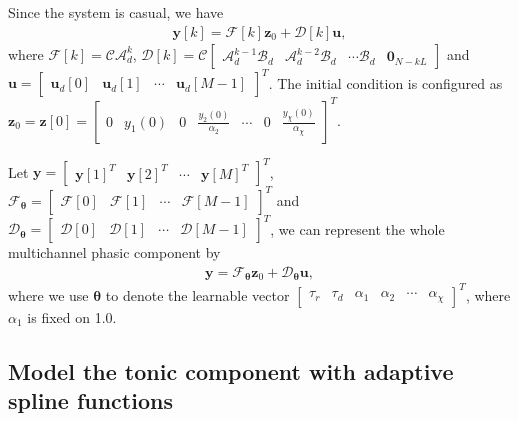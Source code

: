 \documentclass[10pt,conference]{ieeeconf}
\begin{document}
Since the system is casual, we have
\begin{align} \label{fml:the:out-dis}
\mathbf{y}[k] = \mathcal{F}[k] \mathbf{z}_0 + \mathcal{D}[k] \mathbf{u},
\end{align}
where $\mathcal{F}[k] = \mathcal{C}\mathcal{A}_d^k$, $\mathcal{D}[k] = \mathcal{C} \begin{bmatrix}
\mathcal{A}_d^{k-1} \mathcal{B}_d & \mathcal{A}_d^{k-2} \mathcal{B}_d & \cdots \mathcal{B}_d & \mathbf{0}_{N-kL}
\end{bmatrix}$ and \\$\mathbf{u} = \begin{bmatrix}
\mathbf{u}_d[0] & \mathbf{u}_d[1] & \cdots & \mathbf{u}_d[M-1]
\end{bmatrix}^T$. The initial condition is configured as \\$\mathbf{z}_{0} = \mathbf{z}[0] = \begin{bmatrix}
0 & y_1(0) & 0 & \frac{y_2(0)}{\alpha_2} & \cdots & 0 & \frac{y_{\chi}(0)}{\alpha_{\chi}}
\end{bmatrix}^T$.

Let $\mathbf{y} = \begin{bmatrix}
\mathbf{y}[1]^T & \mathbf{y}[2]^T & \cdots & \mathbf{y}[M]^T
\end{bmatrix}^T$, $\mathcal{F}_{\boldsymbol{\theta}} = \begin{bmatrix}
\mathcal{F}[0] & \mathcal{F}[1] & \cdots & \mathcal{F}[M-1]
\end{bmatrix}^T$ and \\$\mathcal{D}_{\boldsymbol{\theta}} = \begin{bmatrix}
\mathcal{D}[0] & \mathcal{D}[1] & \cdots & \mathcal{D}[M-1]
\end{bmatrix}^T$, we can represent the whole multichannel phasic component by
\begin{align} \label{fml:the:out-dis-all}
\mathbf{y} = \mathcal{F}_{\boldsymbol{\theta}} \mathbf{z}_{0} + \mathcal{D}_{\boldsymbol{\theta}} \mathbf{u},
\end{align}
where we use $\boldsymbol{\theta}$ to denote the learnable vector $\begin{bmatrix}
\tau_r & \tau_d & \alpha_1 & \alpha_2 & \cdots & \alpha_{\chi}
\end{bmatrix}^T$, where $\alpha_1$ is fixed on 1.0.

\subsection{Model the tonic component with adaptive spline functions}
\end{document}
